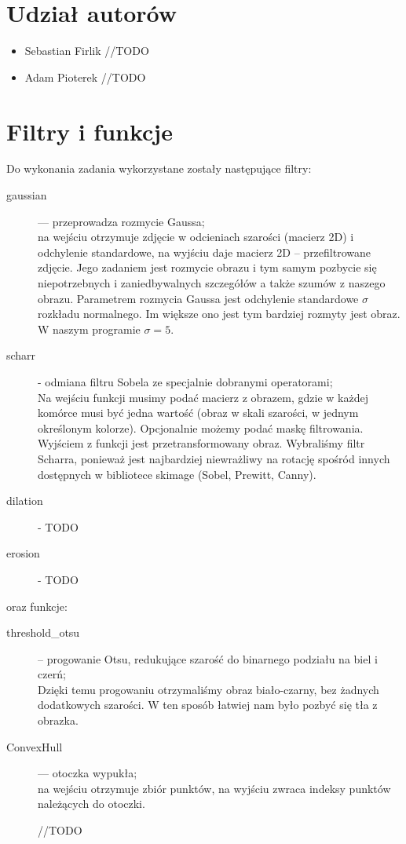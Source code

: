 \documentclass{article}
\begin{document}


\section*{Udział autorów}
\begin{itemize}
\item Sebastian Firlik //TODO
\item Adam Pioterek //TODO
\end{itemize}

\section{Filtry i funkcje}
Do wykonania zadania wykorzystane zostały następujące filtry:
\begin{description}
\item[gaussian] — przeprowadza rozmycie Gaussa;\\
na wejściu otrzymuje zdjęcie w odcieniach szarości (macierz 2D) i odchylenie standardowe, na wyjściu daje macierz 2D – przefiltrowane zdjęcie.
Jego zadaniem jest rozmycie obrazu i tym samym pozbycie się niepotrzebnych i zaniedbywalnych szczegółów  a także szumów z naszego obrazu. Parametrem rozmycia Gaussa jest odchylenie standardowe $\sigma$ rozkładu normalnego. Im większe ono jest tym bardziej rozmyty jest obraz. W naszym programie $\sigma = 5$. 
\item[scharr] - odmiana filtru Sobela ze specjalnie dobranymi operatorami;\\
Na wejściu funkcji musimy podać macierz z obrazem, gdzie w każdej komórce musi być jedna wartość (obraz w skali szarości, w jednym określonym kolorze). Opcjonalnie możemy podać maskę filtrowania. Wyjściem z funkcji jest przetransformowany obraz. Wybraliśmy filtr Scharra, ponieważ jest najbardziej niewrażliwy na rotację spośród innych dostępnych w bibliotece skimage (Sobel, Prewitt, Canny).
\item[dilation] - TODO
\item[erosion] - TODO
\end{description}
oraz funkcje:
\begin{description}
\item[threshold\_otsu] -- progowanie Otsu, redukujące szarość do binarnego podziału na biel i czerń;\\
Dzięki temu progowaniu otrzymaliśmy obraz biało-czarny, bez żadnych dodatkowych szarości. W ten sposób łatwiej nam było pozbyć się tła z obrazka.
\item[ConvexHull] — otoczka wypukła;\\
na wejściu otrzymuje zbiór punktów, na wyjściu zwraca indeksy punktów należących do otoczki.

//TODO
\end{description}
\end{document}
